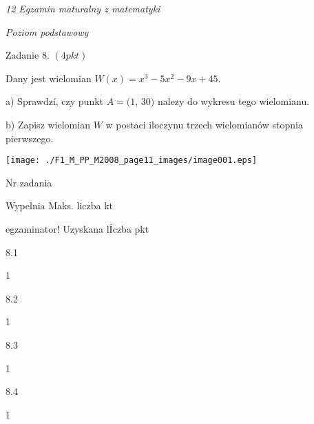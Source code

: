 \documentclass[a4paper,12pt]{article}
\begin{document}
{\it 12 Egzamin maturalny z matematyki}

{\it Poziom podstawowy}

Zadanie 8. $(4pkt)$

Dany jest wielomian $W(x)=x^{3}-5x^{2}-9x+45.$

a) Sprawdzí, czy punkt $A=(1$, 30$)$ nalezy do wykresu tego wielomianu.

b) Zapisz wielomian $W$ w postaci iloczynu trzech wielomianów stopnia pierwszego.
\begin{center}
\texttt{[image: ./F1\_M\_PP\_M2008\_page11\_images/image001.eps]}
\end{center}
Nr zadania

Wypelnia Maks. liczba kt

egzaminator! Uzyskana lÍczba pkt

8.1

1

8.2

1

8.3

1

8.4

1
\end{document}
